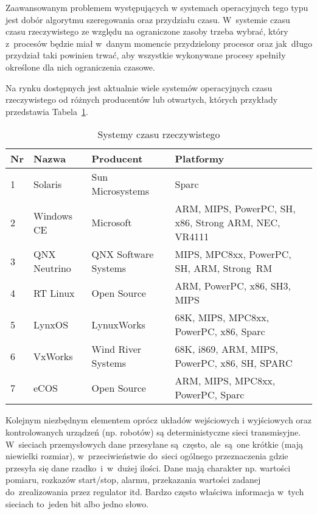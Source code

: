 Zaawansowanym problemem występujących w systemach operacyjnych tego typu jest dobór algorytmu szeregowania oraz przydziału czasu. W~systemie czasu czasu rzeczywistego ze względu na ograniczone zasoby trzeba wybrać, który z~procesów będzie miał w~danym momencie przydzielony procesor oraz jak~długo przydział taki powinien trwać, aby wszystkie wykonywane procesy spełniły określone dla nich ograniczenia czasowe.

Na rynku dostępnych jest aktualnie wiele systemów operacyjnych czasu rzeczywistego od różnych producentów lub otwartych, których przykłady przedstawia Tabela~\ref{rtos}.
\begin{table}[!htb]
\begin{center}
\begin{tabular}{| p{} | p{} | p{} | p{} |}\hline
\textbf{Nr} & \textbf{Nazwa} & \textbf{Producent} & \textbf{Platformy} \\\hline\hline
1 & Solaris & Sun Microsystems & Sparc \\\hline
2 & Windows CE & Microsoft & ARM, MIPS, PowerPC, SH, x86, Strong ARM, NEC, VR4111 \\\hline
3 & QNX Neutrino & QNX Software Systems & MIPS, MPC8xx, PowerPC, SH, ARM, Strong~RM \\\hline
4 & RT Linux & Open Source & ARM, PowerPC, x86, SH3, MIPS \\\hline
5 & LynxOS & LynuxWorks & 68K, MIPS, MPC8xx, PowerPC, x86, Sparc \\\hline
6 & VxWorks & Wind River Systems & 68K, i869, ARM, MIPS, PowerPC, x86, SH, SPARC \\\hline
7 & eCOS & Open Source & ARM, MIPS, MPC8xx, PowerPC, Sparc \\\hline
\end{tabular}
\end{center}
\vspace*{-6mm}
  \caption{Systemy czasu rzeczywistego}
	\label{rtos}
\end{table}

Kolejnym niezbędnym elementem oprócz układów wejściowych i wyjściowych oraz kontrolowanych urządzeń (np. robotów) są deterministyczne sieci transmisyjne.
W~sieciach przemysłowych dane przesyłane są~często, ale~są~one krótkie (mają niewielki rozmiar), w~przeciwieństwie do~sieci ogólnego przeznaczenia gdzie przesyła się dane rzadko~i~w~dużej ilości. Dane mają charakter np. wartości
pomiaru, rozkazów start/stop, alarmu, przekazania wartości zadanej do~zrealizowania przez regulator itd. Bardzo często właściwa informacja w~tych sieciach to~jeden bit albo jedno słowo.

